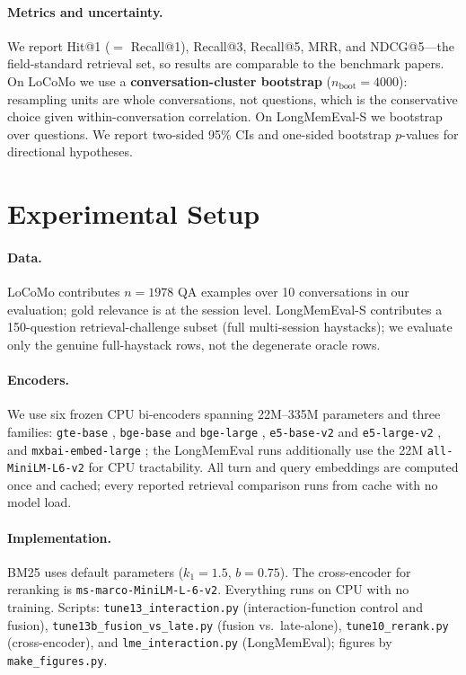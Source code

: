 \documentclass[10pt,twocolumn]{article}
\begin{document}
\paragraph{Metrics and uncertainty.}
We report Hit@1 ($=$ Recall@1), Recall@3, Recall@5, MRR, and NDCG@5---the
field-standard retrieval set, so results are comparable to the benchmark
papers. On LoCoMo we use a \textbf{conversation-cluster bootstrap}
($n_{\mathrm{boot}}{=}4000$): resampling units are whole conversations, not
questions, which is the conservative choice given within-conversation
correlation. On LongMemEval-S we bootstrap over questions. We report two-sided
95\% CIs and one-sided bootstrap $p$-values for directional hypotheses.

\section{Experimental Setup}
\label{sec:setup}
\paragraph{Data.}
LoCoMo \citep{locomo} contributes $n{=}1978$ QA examples over 10
conversations in our evaluation; gold relevance is at the session level.
LongMemEval-S \citep{longmemeval} contributes a 150-question
retrieval-challenge subset (full multi-session haystacks); we evaluate only
the genuine full-haystack rows, not the degenerate oracle rows.

\paragraph{Encoders.}
We use six frozen CPU bi-encoders spanning 22M--335M parameters and three
families: \texttt{gte-base} \citep{gte}, \texttt{bge-base} and
\texttt{bge-large} \citep{bge}, \texttt{e5-base-v2} and \texttt{e5-large-v2}
\citep{e5}, and \texttt{mxbai-embed-large} \citep{mxbai}; the LongMemEval runs
additionally use the 22M \texttt{all-MiniLM-L6-v2} \citep{sbert} for CPU
tractability. All turn and query embeddings are computed once and cached;
every reported retrieval comparison runs from cache with no model load.

\paragraph{Implementation.}
BM25 uses default parameters ($k_1{=}1.5$, $b{=}0.75$). The cross-encoder for
reranking is \texttt{ms-marco-MiniLM-L-6-v2}. Everything runs on CPU with no
training. Scripts: \texttt{tune13\_interaction.py} (interaction-function
control and fusion), \texttt{tune13b\_fusion\_vs\_late.py} (fusion vs.\
late-alone), \texttt{tune10\_rerank.py} (cross-encoder), and
\texttt{lme\_interaction.py} (LongMemEval); figures by
\texttt{make\_figures.py}.
\end{document}
